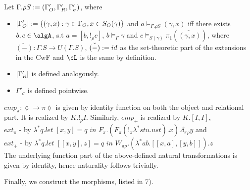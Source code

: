 \documentclass[12pt,a4paper]{article}
\renewcommand{\O}{_{O}}\alwaysmath{O}
\def\R{_{R}}\alwaysmath{R}
\begin{document}
Let $\Gamma . \rho S \define (\Gamma'\O, \Gamma'\R, \Gamma'_\sigma)$, where
\begin{itemize}
  \item $\carr{\Gamma'\O} \define \{(\gamma, x) : \gamma \in \Gamma\O, x \in S\O(\gamma) \}$ and $ a \vDash_{\Gamma. \rho S} (\gamma, x)$ iff there exists $b, c \in \algA$, s.t $a = [b, !_\rho c]$, $b \vDash_{\Gamma} \gamma$ and $c \vDash_{S(\gamma)} \pi_1(\check{(\gamma, x)}) $, where $\check{(-)} : \Gamma . S \to U(\Gamma . S)$, $\check{(-)} := id$ as the set-theoretic part of the extensions in the CwF and $\cL$ is the same by definition.
  
  \item $\carr{\Gamma'\R}$ is defined analogously. 
  
  \item $\Gamma'_\sigma$ is defined pointwise.
\end{itemize}
            
$emp_\pi : \lozenge \to \pi \lozenge$ is given by identity function on both the object and relational part. It is realized by $K. !_\rho I$. Similarly, $emp_+$ is realized by $K . [I, I]$,\\
$ext_\pi$ - by $\lambda^* q. \textit{let }[x, y] = q\textit{ in } F_\pi . (F_\pi (!_\pi \lambda^* s t u. u s t) . x) . \delta_{\pi \rho} y$ and \\
$ext_+$ - by $\lambda^* q. \textit{let } [[x , y], z] = q \textit{ in } W_{\pi\rho}.(\lambda^* a b. [[x, a],  [y, b]]).z$\\

The underlying function part of the above-defined natural transformations is given by identity, hence naturality follows trivially.

%
%
%

Finally, we construct the morphisms, listed in 7).
\end{document}

